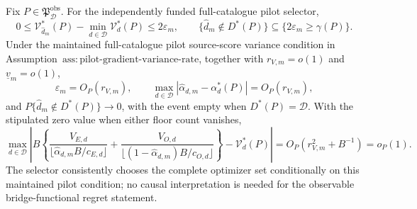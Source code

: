 Fix \(P\in\mathfrak P_{\mathcal D}^{\mathrm{obs}}\). For the independently funded full-catalogue pilot selector,
\[
0\le\mathcal V_{\widehat d_m}^*(P)-\min_{d\in\mathcal D}\mathcal V_d^*(P)\le2\varepsilon_m,
\qquad
\{\widehat d_m\notin D^*(P)\}\subseteq\{2\varepsilon_m\ge\gamma(P)\}.
\]
Under the maintained full-catalogue pilot source-score variance condition in Assumption~\(\mathrm{ass{:}pilot\text{-}gradient\text{-}variance\text{-}rate}\), together with \(r_{V,m}=o(1)\) and \(\underline v_m=o(1)\),
\[
\varepsilon_m=O_P(r_{V,m}),
\qquad
\max_{d\in\mathcal D}|\widehat\alpha_{d,m}-\alpha_d^*(P)|=O_P(r_{V,m}),
\]
and \(P\{\widehat d_m\notin D^*(P)\}\to0\), with the event empty when \(D^*(P)=\mathcal D\). With the stipulated zero value when either floor count vanishes,
\[
\max_{d\in\mathcal D}\left|B\left\{
\frac{V_{E,d}}{\lfloor\widehat\alpha_{d,m}B/c_{E,d}\rfloor}
+\frac{V_{O,d}}{\lfloor(1-\widehat\alpha_{d,m})B/c_{O,d}\rfloor}
\right\}-\mathcal V_d^*(P)\right|
=O_P(r_{V,m}^2+B^{-1})=o_P(1).
\]
The selector consistently chooses the complete optimizer set conditionally on this maintained pilot condition; no causal interpretation is needed for the observable bridge-functional regret statement.
